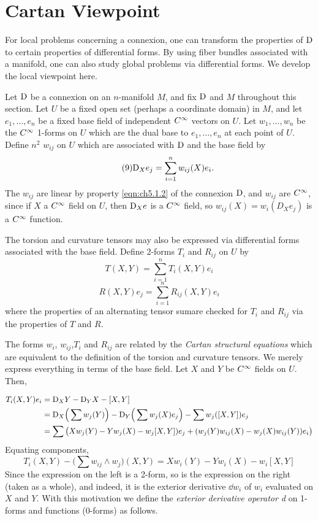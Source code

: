 \documentclass[../main]{subfiles}
\begin{document}
\section{Cartan Viewpoint}\label{ch05:s2}

For local problems concerning a connexion, one can transform the properties of $\mathrm{D}$ to certain properties of differential forms. By using fiber bundles associated with a manifold, one can also study global problems via differential forms. We develop the local viewpoint here.

Let $\mathrm{D}$ be a connexion on an $n$-manifold $M$, and fix $\mathrm{D}$ and $M$ throughout this section. Let $U$ be a fixed open set (perhaps a coordinate domain) in $M$, and let $e_1,\dots,e_n$ be a fixed base field of independent $C^\infty$ vectors on $U$. Let $w_1,\dots,w_n$ be the $C^\infty$ 1-forms on $U$ which are the dual base to $e_1,\dots,e_n$ at each point of $U$. Define $n^2$  $w_{ij}$ on $U$ which are associated with $\mathrm{D}$ and the base field by
\begin{equation}\label{eq:ch05.9}
\tag{9}
\mathrm{D}_X e_j = \sum_{i=1}^n w_{ij} (X)e_i.
\end{equation}
The $w_{ij}$ are linear by property \ref{eqn:ch5.1.2} of the connexion $\mathrm{D}$, and $w_{ij}$ are $C^\infty$, since if $X$ a $C^\infty$ field on $U$, then $\mathrm{D}_X e$ is a $C^\infty$ field, so $w_{ij}(X) = w_i(D_X e_j)$ is a $C^\infty$ function.

The torsion and curvature tensors may also be expressed via differential forms associated with the base field. Define 2-forms $T_i$ and $R_{ij}$ on $U$ by
\[\label{eqn:ch05.10}\tag{10} T(X,Y) = \sum_{i=1}^n T_i(X,Y)e_i\]
\[\label{eqn:ch05.11}\tag{11} R(X,Y)e_j = \sum_{i=1}^n R_{ij}(X,Y)e_i\]
where the properties of an alternating tensor sumare checked for $T_i$ and $R_{ij}$ via the properties of $T$ and $R$.

The forms $w_i$, $w_{ij}$,$T_i$ and $R_{ij}$ are related by the \emph{Cartan structural equations} which are equivalent to the definition of the torsion and curvature tensors. We merely express everything in terms of the base field. Let $X$ and $Y$ be $C^\infty$ fields on $U$. Then,

\begin{align*}
    T_i(X,Y)e_i &= \mathrm{D}_XY-\mathrm{D}_YX -[X,Y]\\ &= \mathrm{D}_X\Big(\sum w_j(Y)\Big) - \mathrm{D}_Y\Big(\sum w_j(X)e_j\Big) - \sum w_j([X,Y])e_j \\ &= \sum \big(Xw_j(Y)-Yw_j(X) -w_j[X,Y])e_j+(w_j(Y)w_{ij}(X)-w_j(X)w_{ij}(Y))e_i\big) 
\end{align*}
Equating components,
\[T_i(X,Y) - \Big(\sum w_{ij}\wedge w_j\Big)(X,Y) = Xw_i(Y) -Yw_i(X) - w_i[X,Y] \]
Since the expression on the left is a 2-form, so is the expression on the right (taken as a whole), and indeed, it is the exterior derivative $\dd w_i$ of $w_i$ evaluated on $X$ and $Y$. With this motivation we define the \emph{exterior derivative operator d} on 1-forms and functions (0-forms) as follows.
\end{document}

